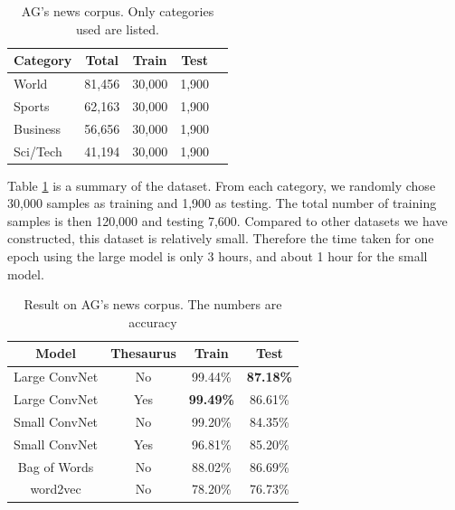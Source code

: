 \documentclass{article}
\begin{document}
\begin{CJK}{UTF8}{gbsn}
\begin{table}[ht]
  \caption{AG's news corpus. Only categories used are listed.}
  \label{tab:nwsd}
  \begin{center}
    \begin{tabular}{lcccc}
      \hline
      \abovespace\belowspace
      Category & Total & Train & Test \\
      \hline
      \abovespace
      World & 81,456 & 30,000 & 1,900 \\
      Sports & 62,163 & 30,000 & 1,900 \\
      Business & 56,656 & 30,000 & 1,900 \\
      \belowspace
      Sci/Tech & 41,194 & 30,000 & 1,900 \\
      \hline
    \end{tabular}
  \end{center}
\end{table}

Table \ref{tab:nwsd} is a summary of the dataset. From each category, we randomly chose 30,000 samples as training and 1,900 as testing. The total number of training samples is then 120,000 and testing 7,600. Compared to other datasets we have constructed, this dataset is relatively small. Therefore the time taken for one epoch using the large model is only 3 hours, and about 1 hour for the small model. %

\begin{table}[ht]
  \caption{Result on AG's news corpus. The numbers are accuracy}
  \label{tab:nwsr}
  \begin{center}
    \begin{tabular}{cccc}
      \hline
      \abovespace\belowspace
      Model & Thesaurus & Train & Test  \\
      \hline
      \abovespace
      Large ConvNet & No & 99.44\% & \textbf{87.18\%} \\
      Large ConvNet & Yes & \textbf{99.49\%} & 86.61\% \\
      Small ConvNet & No & 99.20\% & 84.35\% \\
      Small ConvNet & Yes & 96.81\% & 85.20\% \\
      Bag of Words & No & 88.02\% & 86.69\% \\
      \belowspace
      word2vec & No & 78.20\% & 76.73\% \\
      \hline
    \end{tabular}
  \end{center}
\end{table}


\end{CJK}
\end{document}
